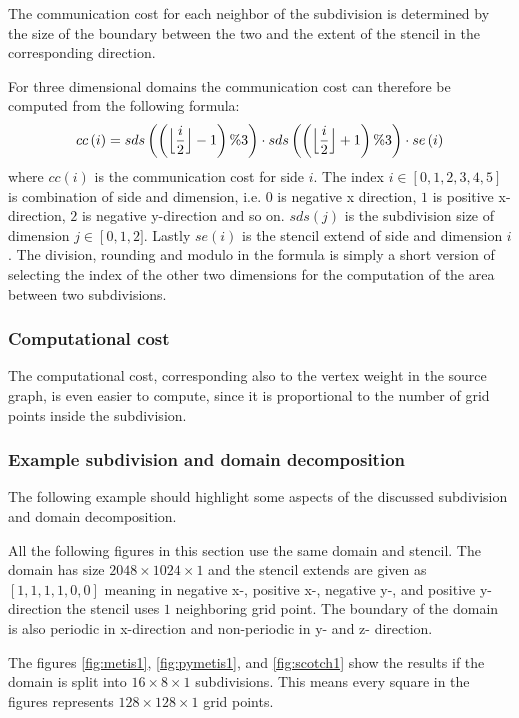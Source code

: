 The communication cost for each neighbor of the subdivision is determined by the size of the boundary between the two and the extent of the stencil in the corresponding direction.

For three dimensional domains the communication cost can therefore be computed from the following formula:
\begin{equation}
cc\left(i\right) = sds\left(\left(\floor[\Big]{\frac{i}{2}} - 1\right) \% 3 \right) \cdot sds\left(\left(\floor[\Big]{\frac{i}{2}} + 1\right) \% 3 \right) \cdot se\left(i\right)
\end{equation}
where $cc\left(i\right)$ is the communication cost for side $i$.
The index $i \in \left[0, 1, 2, 3, 4, 5\right]$ is combination of side and dimension, i.e. $0$ is negative x direction, $1$ is positive x-direction, $2$ is negative y-direction and so on.
$sds\left(j\right)$ is the subdivision size of dimension $j \in \left[0,1,2]$.
Lastly $se\left(i\right)$ is the stencil extend of side and dimension $i$.
The division, rounding and modulo in the formula is simply a short version of selecting the index of the other two dimensions for the computation of the area between two subdivisions.

\subsubsection{Computational cost}

The computational cost, corresponding also to the vertex weight in the source graph, is even easier to compute, since it is proportional to the number of grid points inside the subdivision.

\subsubsection{Example subdivision and domain decomposition}
The following example should highlight some aspects of the discussed subdivision and domain decomposition.

All the following figures in this section use the same domain and stencil.
The domain has size $2048 \times 1024 \times 1$ and the stencil extends are given as $\left[1, 1, 1, 1, 0, 0\right]$ meaning in negative x-, positive x-, negative y-, and positive y-direction the stencil uses $1$ neighboring grid point.
The boundary of the domain is also periodic in x-direction and non-periodic in y- and z- direction.

The figures \ref{fig:metis1}, \ref{fig:pymetis1}, and \ref{fig:scotch1} show the results if the domain is split into $16 \times 8 \times 1$ subdivisions.
This means every square in the figures represents $128 \times 128 \times 1$ grid points.

